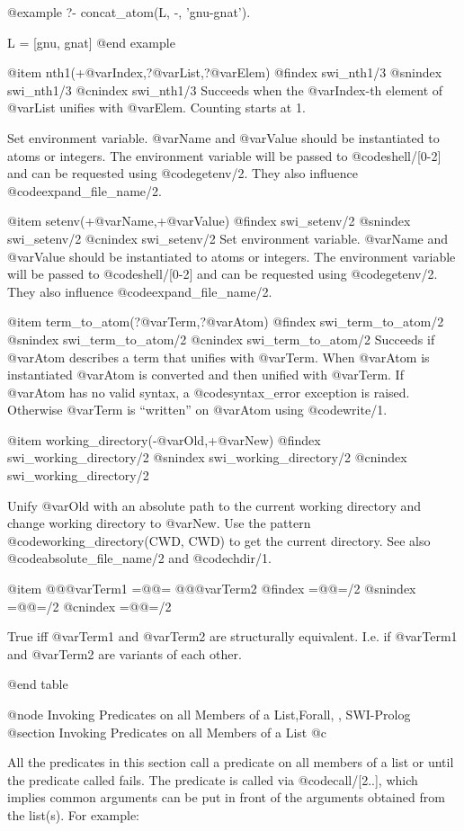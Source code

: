 @example
?- concat_atom(L, -, 'gnu-gnat').

L = [gnu, gnat]
@end example

@item nth1(+@var{Index},?@var{List},?@var{Elem})
@findex swi_nth1/3
@snindex swi_nth1/3
@cnindex swi_nth1/3
Succeeds when the @var{Index}-th element of @var{List} unifies with
@var{Elem}. Counting starts at 1.

Set environment variable.  @var{Name} and @var{Value} should be
instantiated to atoms or integers.  The environment variable will be
passed to @code{shell/[0-2]} and can be requested using @code{getenv/2}.
They also influence @code{expand_file_name/2}.

@item setenv(+@var{Name},+@var{Value})
@findex swi_setenv/2
@snindex swi_setenv/2
@cnindex swi_setenv/2
Set environment variable.  @var{Name} and @var{Value} should be
instantiated to atoms or integers.  The environment variable will be
passed to @code{shell/[0-2]} and can be requested using @code{getenv/2}.
They also influence @code{expand_file_name/2}.

@item term_to_atom(?@var{Term},?@var{Atom})
@findex swi_term_to_atom/2
@snindex swi_term_to_atom/2
@cnindex swi_term_to_atom/2
Succeeds if @var{Atom} describes a term that unifies with @var{Term}. When
@var{Atom} is instantiated @var{Atom} is converted and then unified with
@var{Term}.  If @var{Atom} has no valid syntax, a @code{syntax_error}
exception is raised. Otherwise @var{Term} is ``written'' on @var{Atom}
using @code{write/1}.

@item working_directory(-@var{Old},+@var{New})
@findex swi_working_directory/2
@snindex swi_working_directory/2
@cnindex swi_working_directory/2

Unify @var{Old} with an absolute path to the current working directory
and change working directory to @var{New}.  Use the pattern
@code{working_directory(CWD, CWD)} to get the current directory.  See
also @code{absolute_file_name/2} and @code{chdir/1}.

@item @@@var{Term1} =@@= @@@var{Term2}
@findex =@@=/2
@snindex =@@=/2
@cnindex =@@=/2

True iff @var{Term1} and @var{Term2} are structurally equivalent. I.e. if @var{Term1} and @var{Term2} are variants of each other.

@end table

@node Invoking Predicates on all Members of a List,Forall, , SWI-Prolog
@section Invoking Predicates on all Members of a List
@c \label{sec:applylist}

All the predicates in this section call a predicate on all members of a
list or until the predicate called fails.  The predicate is called via
@code{call/[2..]}, which implies common arguments can be put in
front of the arguments obtained from the list(s). For example:

